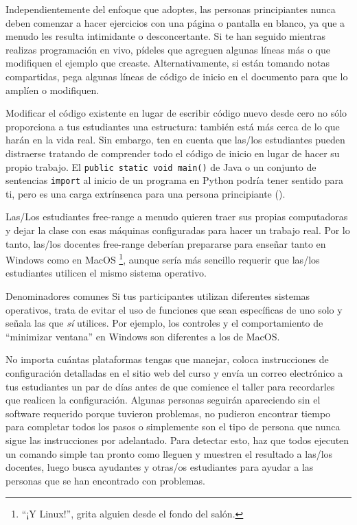 Independientemente del enfoque que adoptes,
las personas principiantes nunca deben comenzar a hacer ejercicios con una página o pantalla en blanco,
ya que a menudo les resulta intimidante o desconcertante.
Si te han seguido mientras realizas programación en vivo,
pídeles que agreguen algunas líneas más
o que modifiquen el ejemplo que creaste.
Alternativamente, si están tomando notas compartidas,
pega algunas líneas de código de inicio en el documento
para que lo amplíen o modifiquen.

Modificar el código existente en lugar de escribir código nuevo desde cero
no sólo proporciona a tus estudiantes una estructura:
también está más cerca de lo que harán en la vida real.
Sin embargo,
ten en cuenta que las/los estudiantes pueden distraerse tratando de comprender todo el código de inicio
en lugar de hacer su propio trabajo.
El \texttt{public static void main()} de Java
o un conjunto de sentencias \texttt{import} al inicio de un programa en Python
podría tener sentido para ti,
pero es una carga extrínsenca para una persona principiante ().


Las/Los estudiantes free-range a menudo quieren traer sus propias computadoras
y dejar la clase con esas máquinas configuradas para hacer un trabajo real.
Por lo tanto, las/los docentes free-range deberían prepararse para enseñar tanto en Windows como en MacOS \footnote{``¡Y Linux!'', grita alguien desde el fondo del salón.},
aunque sería más sencillo requerir que las/los estudiantes utilicen el mismo sistema operativo.

\begin{aside}{Denominadores comunes}
  Si tus participantes utilizan diferentes sistemas operativos,
  trata de evitar el uso de funciones que sean específicas de uno solo
  y señala las que \emph{sí} utilices.
  Por ejemplo,
  los controles y el comportamiento de ``minimizar ventana'' en Windows son diferentes
  a los de MacOS.
\end{aside}

No importa cuántas plataformas tengas que manejar,
coloca instrucciones de configuración detalladas en el sitio web del curso
y envía un correo electrónico a tus estudiantes un par de días antes de que comience el taller
para recordarles que realicen la configuración.
Algunas personas seguirán apareciendo sin el software requerido porque
tuvieron problemas,
no pudieron encontrar tiempo para completar todos los pasos
o simplemente son el tipo de persona que nunca sigue las instrucciones por adelantado.
Para detectar esto,
haz que todos ejecuten un comando simple tan pronto como lleguen
y muestren el resultado a las/los docentes,
luego busca ayudantes y otras/os estudiantes
para ayudar a las personas que se han encontrado con problemas.

